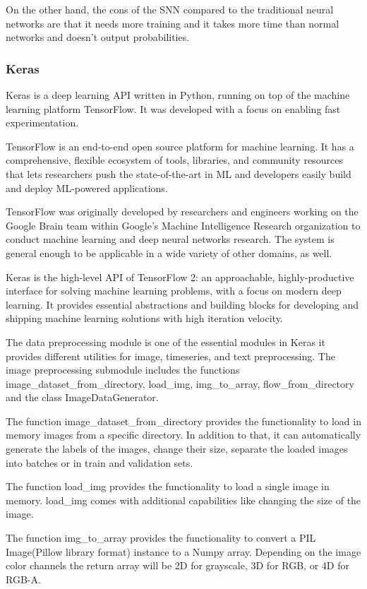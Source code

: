 On the other hand, the cons of the SNN compared to the traditional neural networks are that it needs more training and it takes more time than normal networks and doesn’t output probabilities.

\subsubsection{Keras}
Keras is a deep learning API written in Python, running on top of the machine learning platform TensorFlow. It was developed with a focus on enabling fast experimentation. 

TensorFlow is an end-to-end open source platform for machine learning. It has a comprehensive, flexible ecosystem of tools, libraries, and community resources that lets researchers push the state-of-the-art in ML and developers easily build and deploy ML-powered applications.

TensorFlow was originally developed by researchers and engineers working on the Google Brain team within Google's Machine Intelligence Research organization to conduct machine learning and deep neural networks research. The system is general enough to be applicable in a wide variety of other domains, as well.

Keras is the high-level API of TensorFlow 2: an approachable, highly-productive interface for solving machine learning problems, with a focus on modern deep learning. It provides essential abstractions and building blocks for developing and shipping machine learning solutions with high iteration velocity.

The data preprocessing module is one of the essential modules in Keras it provides different utilities for image, timeseries, and text preprocessing. The image preprocessing submodule includes the functions image_dataset_from_directory, load_img, img_to_array, flow_from_directory and the class ImageDataGenerator.

The function image_dataset_from_directory provides the functionality to load in memory images from a specific directory. In addition to that, it can automatically generate the labels of the images, change their size, separate the loaded images into batches or in train and validation sets.

The function load_img provides the functionality to load a single image in memory. load_img comes with additional capabilities like changing the size of the image.

The function img_to_array provides the functionality to convert a PIL Image(Pillow library format) instance to a Numpy array. Depending on the image color channels the return array will be 2D for grayscale, 3D for RGB, or 4D for RGB-A.













